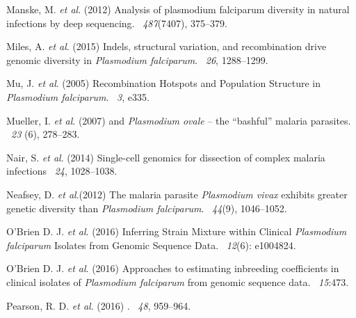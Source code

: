 \documentclass{article}
\begin{document}
\begin{thebibliography}{}
Manske, M. {\em et al}. (2012)
\newblock Analysis of plasmodium falciparum diversity in natural infections by deep sequencing.
~{\em 487\/}(7407), 375--379.

Miles, A. {\em et al}. (2015)
\newblock Indels, structural variation, and recombination drive genomic diversity in {\it Plasmodium falciparum}.
~{\em26\/}, 1288--1299.

Mu, J. {\em et al}. (2005)
\newblock Recombination Hotspots and Population Structure in {\it Plasmodium falciparum}.
~{\em 3}, e335.

Mueller, I. {\em et al}. (2007)
 and {\it Plasmodium ovale} -- the ``bashful'' malaria parasites.
~{\em 23\/} (6), 278--283.

Nair, S. {\em et al}. (2014)
\newblock Single-cell genomics for dissection of complex malaria infections
~{\em 24}, 1028--1038.

Neafsey, D. {\em et al}.(2012)
\newblock The malaria parasite {\it Plasmodium vivax} exhibits greater genetic diversity than {\it Plasmodium falciparum}.
~{\em 44\/}(9), 1046--1052.

O'Brien D. J. {\em et al}. (2016)
\newblock Inferring Strain Mixture within Clinical {\em Plasmodium falciparum} Isolates from Genomic Sequence Data.
~{\em 12\/}(6): e1004824.

O'Brien D. J. {\em et al}. (2016)
\newblock Approaches to estimating inbreeding coefficients in clinical isolates of {\it Plasmodium falciparum} from genomic sequence data.
~{\em 15}:473.

Pearson, R. D. {\em et al}. (2016)
.
~{\em 48}, 959--964.


\end{thebibliography}
\end{document}
